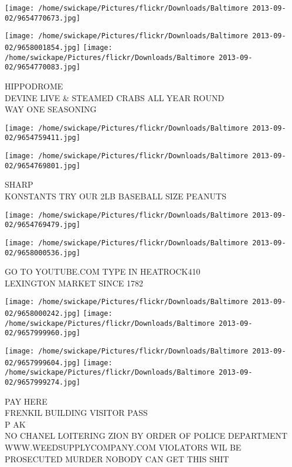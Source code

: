 \documentclass[10pt,letterpaper]{article}
\begin{document}
\texttt{[image: /home/swickape/Pictures/flickr/Downloads/Baltimore 2013-09-02/9654770673.jpg]}

\vspace{0.25in}
\texttt{[image: /home/swickape/Pictures/flickr/Downloads/Baltimore 2013-09-02/9658001854.jpg]}
\texttt{[image: /home/swickape/Pictures/flickr/Downloads/Baltimore 2013-09-02/9654770083.jpg]}

HIPPODROME\\
DEVINE LIVE \& STEAMED CRABS ALL YEAR ROUND\\
WAY ONE SEASONING\\
\pagebreak

\texttt{[image: /home/swickape/Pictures/flickr/Downloads/Baltimore 2013-09-02/9654759411.jpg]}

\vspace{0.25in}
\texttt{[image: /home/swickape/Pictures/flickr/Downloads/Baltimore 2013-09-02/9654769801.jpg]}

SHARP\\
KONSTANTS TRY OUR 2LB BASEBALL SIZE PEANUTS\\
\pagebreak

\texttt{[image: /home/swickape/Pictures/flickr/Downloads/Baltimore 2013-09-02/9654769479.jpg]}

\vspace{0.25in}
\texttt{[image: /home/swickape/Pictures/flickr/Downloads/Baltimore 2013-09-02/9658000536.jpg]}

GO TO YOUTUBE.COM TYPE IN HEATROCK410\\
LEXINGTON MARKET SINCE 1782\\
\pagebreak

\texttt{[image: /home/swickape/Pictures/flickr/Downloads/Baltimore 2013-09-02/9658000242.jpg]}
\texttt{[image: /home/swickape/Pictures/flickr/Downloads/Baltimore 2013-09-02/9657999960.jpg]}

\texttt{[image: /home/swickape/Pictures/flickr/Downloads/Baltimore 2013-09-02/9657999604.jpg]}
\texttt{[image: /home/swickape/Pictures/flickr/Downloads/Baltimore 2013-09-02/9657999274.jpg]}

PAY HERE\\
FRENKIL BUILDING VISITOR PASS\\
P AK\\
NO CHANEL LOITERING ZION BY ORDER OF POLICE DEPARTMENT WWW.WEEDSUPPLYCOMPANY.COM VIOLATORS WIL BE PROSECUTED MURDER NOBODY CAN GET THIS SHIT\\
\pagebreak
\end{document}
